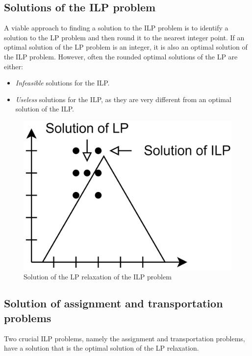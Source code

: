 \subsection{Solutions of the ILP problem}
A viable approach to finding a solution to the ILP problem is to identify a solution to the LP problem and then round it to the nearest integer point.
If an optimal solution of the LP problem is an integer, it is also an optimal solution of the ILP problem. 
However, often the rounded optimal solutions of the LP are either:
\begin{itemize}
    \item \textit{Infeasible} solutions for the ILP.
    \item \textit{Useless} solutions for the ILP, as they are very different from an optimal solution of the ILP.
\end{itemize}
\begin{figure}[H]
    \centering
    \includegraphics[width=0.25\linewidth]{images/ilp2.png}
    \caption{Solution of the LP relaxation of the ILP problem}
\end{figure}

\subsection{Solution of assignment and transportation problems}
Two crucial ILP problems, namely the assignment and transportation problems, have a solution that is the optimal solution of the LP relaxation.

